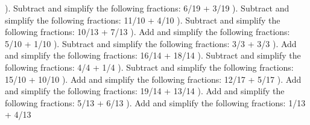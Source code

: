 \documentclass{article}%
\begin{document}
). Subtract and simplify the following fractions: 6/19 + 3/19%
\newline%
\newline%
). Subtract and simplify the following fractions: 11/10 + 4/10%
\newline%
\newline%
). Subtract and simplify the following fractions: 10/13 + 7/13%
\newline%
\newline%
). Add and simplify the following fractions: 5/10 + 1/10%
\newline%
\newline%
). Subtract and simplify the following fractions: 3/3 + 3/3%
\newline%
\newline%
). Add and simplify the following fractions: 16/14 + 18/14%
\newline%
\newline%
). Subtract and simplify the following fractions: 4/4 + 1/4%
\newline%
\newline%
). Subtract and simplify the following fractions: 15/10 + 10/10%
\newline%
\newline%
). Add and simplify the following fractions: 12/17 + 5/17%
\newline%
\newline%
). Add and simplify the following fractions: 19/14 + 13/14%
\newline%
\newline%
). Add and simplify the following fractions: 5/13 + 6/13%
\newline%
\newline%
). Add and simplify the following fractions: 1/13 + 4/13%
\newline%
\newline%
\newline%
\end{document}
